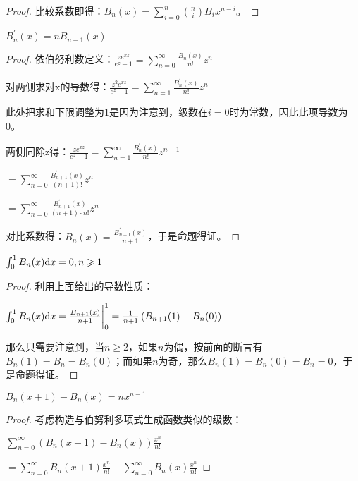\documentclass[12pt, a4paper, oneside, UTF8]{ctexbook}
\begin{document}
\begin{para}{0}
\begin{para}{1}
\begin{proof}
					比较系数即得：$B_n(x) = \sum\limits_{i=0}^{n} \binom{n}{i}B_i x^{n-i}$。
				\end{proof}
				\point{}
				\begin{proposition}
					$B_n^{\prime} (x) = n B_{n-1} (x)$
				\end{proposition}
				\begin{proof}
					依伯努利数定义：$\frac{z e^{xz}}{e^z-1} = \sum\limits_{n=0}^{\infty} \frac{B_n(x)}{n!}z^n$
					
					对两侧求对x的导数得：$\frac{z^2 e^{xz}}{e^z-1} = \sum\limits_{n=1}^{\infty} \frac{B_n^{\prime}(x)}{n!}z^n$
					
					此处把求和下限调整为1是因为注意到，级数在$i=0$时为常数，因此此项导数为0。
					
					两侧同除z得：$\frac{z e^{xz}}{e^z-1} = \sum\limits_{n=1}^{\infty} \frac{B_n^{\prime}(x)}{n!}z^{n-1}$
					
					$=\sum\limits_{n=0}^{\infty} \frac{B_{n+1}^{\prime}(x)}{(n+1)!}z^{n}$
					
					$=\sum\limits_{n=0}^{\infty} \frac{B_{n+1}^{\prime}(x)}{(n+1)\cdot n!}z^{n}$
					
					对比系数得：$B_n(x) = \frac{B_{n+1}^{\prime}(x)}{n+1}$，于是命题得证。
				\end{proof}
				\point{}
				\begin{proposition}
					$\int_{0}^{1} B_n (x) \mathrm{d} x = 0 ,n \geqslant 1$
				\end{proposition}
				\begin{proof}
					利用上面给出的导数性质：
					
					$\int_{0}^{1} B_n (x) \mathrm{d} x = \frac{B_{n+1}(x)}{n+1} \bigg|_{0}^{1} = \frac{1}{n+1}\left(B_{n+1}(1)-B_n(0)\right)$
					
					那么只需要注意到，当$n\geqslant 2$，如果$n$为偶，按前面的断言有$B_n(1)=B_n=B_n(0)$；而如果$n$为奇，那么$B_n(1) = B_n(0) = B_n = 0$，于是命题得证。
				\end{proof}
				\point{}
				\begin{proposition}
					$B_n (x+1)-B_n (x) = nx^{n-1}$
				\end{proposition}
				\begin{proof}
					考虑构造与伯努利多项式生成函数类似的级数：
					
					$\sum\limits_{n=0}^{\infty} \left(B_n(x+1)-B_n(x)\right) \frac{x^n}{n!}$
					
					$=\sum\limits_{n=0}^{\infty} B_n(x+1) \frac{x^n}{n!}-\sum\limits_{n=0}^{\infty} B_n(x) \frac{x^n}{n!}$
					

\end{proof}
\end{para}
\end{para}
\end{document}
